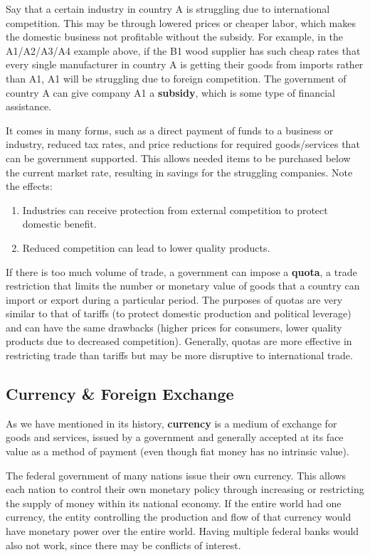 \documentclass{article}
\begin{document}
    Say that a certain industry in country A is struggling due to international competition. This may be through lowered prices or cheaper labor, which makes the domestic business not profitable without the subsidy. For example, in the A1/A2/A3/A4 example above, if the B1 wood supplier has such cheap rates that every single manufacturer in country A is getting their goods from imports rather than A1, A1 will be struggling due to foreign competition. The government of country A can give company A1 a \textbf{subsidy}, which is some type of financial assistance.

    It comes in many forms, such as a direct payment of funds to a business or industry, reduced tax rates, and price reductions for required goods/services that can be government supported. This allows needed items to be purchased below the current market rate, resulting in savings for the struggling companies. Note the effects:

    \begin{enumerate}
      \item Industries can receive protection from external competition to protect domestic benefit.
      \item Reduced competition can lead to lower quality products.
    \end{enumerate}
    If there is too much volume of trade, a government can impose a \textbf{quota}, a trade restriction that limits the number or monetary value of goods that a country can import or export during a particular period. The purposes of quotas are very similar to that of tariffs (to protect domestic production and political leverage) and can have the same drawbacks (higher prices for consumers, lower quality products due to decreased competition). Generally, quotas are more effective in restricting trade than tariffs but may be more disruptive to international trade.

  \subsection{Currency \& Foreign Exchange}

    As we have mentioned in its history, \textbf{currency} is a medium of exchange for goods and services, issued by a government and generally accepted at its face value as a method of payment (even though fiat money has no intrinsic value).

    The federal government of many nations issue their own currency. This allows each nation to control their own monetary policy through increasing or restricting the supply of money within its national economy. If the entire world had one currency, the entity controlling the production and flow of that currency would have monetary power over the entire world. Having multiple federal banks would also not work, since there may be conflicts of interest.
\end{document}
